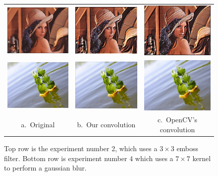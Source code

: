\documentclass[]{IEEEtran}
\begin{document}
    \begin{figure}[t]
      \centering
      \begin{tabular}{c c c}
      \includegraphics[width=0.23\linewidth]{./figures/2/lena.jpg} &
      \includegraphics[width=0.23\linewidth]{./figures/2/lena-2-2.jpg} &
      \includegraphics[width=0.23\linewidth]{./figures/2/lena-2-2-cv.jpg} \\
      \includegraphics[width=0.23\linewidth]{./figures/2/lake.jpg} &
      \includegraphics[width=0.23\linewidth]{./figures/2/lake-2-4.jpg} &
      \includegraphics[width=0.23\linewidth]{./figures/2/lake-2-4-cv.jpg} \\
      a.~Original & b.~Our convolution & c.~OpenCV's convolution
      \end{tabular}
      \caption{Top row is the experiment number 2, which uses a $3 \times 3$ emboss filter. Bottom row is experiment number 4 which uses a $7 \times 7$ kernel to perform a gaussian blur.}
      \label{figure:conv}
    \end{figure}
\end{document}
